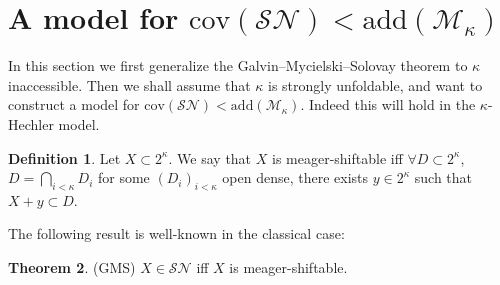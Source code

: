 \documentclass[12pt,a4paper]{scrartcl}
\theoremstyle{definition}
\newtheorem{definition}{Definition}[section]
\newtheorem{theorem}[definition]{Theorem}
\numberwithin{equation}{section}
\begin{document}
\section{A model for $\text{cov}(\mathcal{SN}) < \text{add}(\mathcal{M}_\kappa)$}

In this section we first generalize the Galvin–Mycielski–Solovay theorem to $\kappa$ inaccessible. Then we shall assume that $\kappa$ is strongly unfoldable, and want to construct a model for $\text{cov}(\mathcal{SN}) < \text{add}(\mathcal{M}_\kappa)$. Indeed this will hold in the $\kappa$-Hechler model.

\begin{definition}
Let $X \subset 2^\kappa$. We say that $X$ is meager-shiftable iff $\forall D \subset 2^\kappa$, $D= \bigcap_{i<\kappa} D_i$ for some $(D_i)_{i<\kappa}$ open dense, there exists $y \in 2^\kappa$ such that $X + y \subset D$.
\end{definition}

The following result is well-known in the classical case:

\begin{theorem} \label{T3}
{(GMS)} $X \in \mathcal{SN}$ iff $X$ is meager-shiftable.
\end{theorem}
\end{document}
